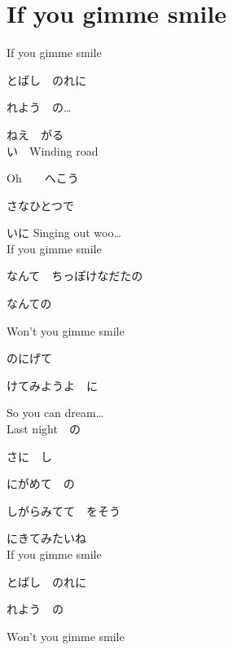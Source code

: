 \section{ If you gimme smile}
\large{

If you gimme smile

とばし　のれに

れよう　の…

ねえ　がる
\\

い　Winding road

Oh　　へこう

さなひとつで

いに Singing out woo…
\\

If you gimme smile

なんて　ちっぽけなだたの

なんての

Won't you gimme smile

のにげて

けてみようよ　に

So you can dream…
\\

Last night　の

さに　し

にがめて　の

しがらみてて　をそう

にきてみたいね
\\

If you gimme smile

とばし　のれに

れよう　の

Won't you gimme smile

}
